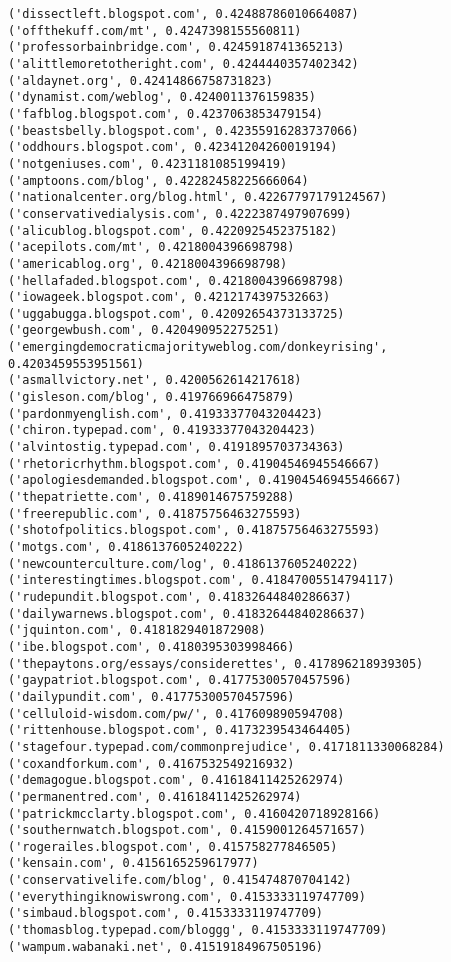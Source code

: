 \documentclass[11pt]{article}
\begin{document}
\begin{Verbatim}[commandchars=\\\{\}]
('dissectleft.blogspot.com', 0.42488786010664087)
('offthekuff.com/mt', 0.4247398155560811)
('professorbainbridge.com', 0.4245918741365213)
('alittlemoretotheright.com', 0.4244440357402342)
('aldaynet.org', 0.42414866758731823)
('dynamist.com/weblog', 0.4240011376159835)
('fafblog.blogspot.com', 0.4237063853479154)
('beastsbelly.blogspot.com', 0.42355916283737066)
('oddhours.blogspot.com', 0.42341204260019194)
('notgeniuses.com', 0.4231181085199419)
('amptoons.com/blog', 0.42282458225666064)
('nationalcenter.org/blog.html', 0.42267797179124567)
('conservativedialysis.com', 0.4222387497907699)
('alicublog.blogspot.com', 0.4220925452375182)
('acepilots.com/mt', 0.4218004396698798)
('americablog.org', 0.4218004396698798)
('hellafaded.blogspot.com', 0.4218004396698798)
('iowageek.blogspot.com', 0.4212174397532663)
('uggabugga.blogspot.com', 0.42092654373133725)
('georgewbush.com', 0.420490952275251)
('emergingdemocraticmajorityweblog.com/donkeyrising', 0.4203459553951561)
('asmallvictory.net', 0.4200562614217618)
('gisleson.com/blog', 0.419766966475879)
('pardonmyenglish.com', 0.41933377043204423)
('chiron.typepad.com', 0.41933377043204423)
('alvintostig.typepad.com', 0.4191895703734363)
('rhetoricrhythm.blogspot.com', 0.41904546945546667)
('apologiesdemanded.blogspot.com', 0.41904546945546667)
('thepatriette.com', 0.4189014675759288)
('freerepublic.com', 0.41875756463275593)
('shotofpolitics.blogspot.com', 0.41875756463275593)
('motgs.com', 0.4186137605240222)
('newcounterculture.com/log', 0.4186137605240222)
('interestingtimes.blogspot.com', 0.41847005514794117)
('rudepundit.blogspot.com', 0.41832644840286637)
('dailywarnews.blogspot.com', 0.41832644840286637)
('jquinton.com', 0.4181829401872908)
('ibe.blogspot.com', 0.4180395303998466)
('thepaytons.org/essays/considerettes', 0.417896218939305)
('gaypatriot.blogspot.com', 0.41775300570457596)
('dailypundit.com', 0.41775300570457596)
('celluloid-wisdom.com/pw/', 0.417609890594708)
('rittenhouse.blogspot.com', 0.4173239543464405)
('stagefour.typepad.com/commonprejudice', 0.4171811330068284)
('coxandforkum.com', 0.4167532549216932)
('demagogue.blogspot.com', 0.41618411425262974)
('permanentred.com', 0.41618411425262974)
('patrickmcclarty.blogspot.com', 0.4160420718928166)
('southernwatch.blogspot.com', 0.4159001264571657)
('rogerailes.blogspot.com', 0.415758277846505)
('kensain.com', 0.4156165259617977)
('conservativelife.com/blog', 0.415474870704142)
('everythingiknowiswrong.com', 0.4153333119747709)
('simbaud.blogspot.com', 0.4153333119747709)
('thomasblog.typepad.com/bloggg', 0.4153333119747709)
('wampum.wabanaki.net', 0.41519184967505196)

\end{Verbatim}
\end{document}
